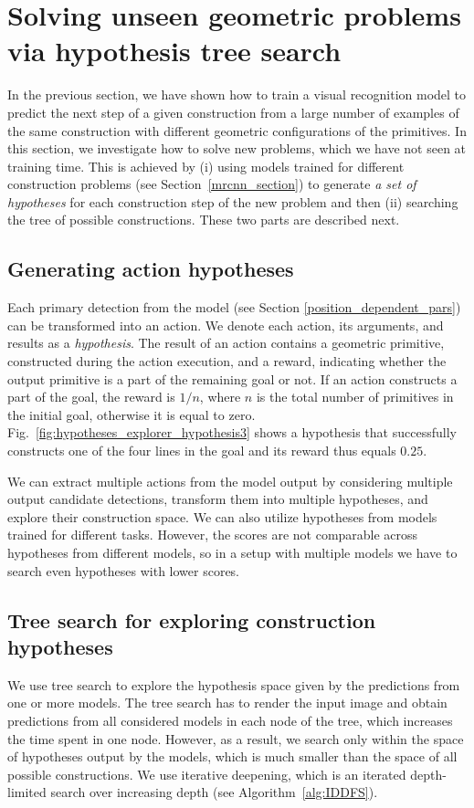 \section{Solving unseen geometric problems via hypothesis tree search}
\label{sec:unseen_levels}
In the previous section, we have shown how to train a visual recognition model to predict the next step of a given construction from a large number of examples of the same construction with different geometric configurations of the primitives. In this section, we investigate how to solve new problems, which we have not seen at training time.
This is achieved by (i) using models trained for different construction problems (see Section~\ref{mrcnn_section}) to generate {\em a set of hypotheses} for each construction step of the new problem and then (ii) searching the tree of possible constructions. These two parts are described next. 

\subsection{Generating action hypotheses}
Each primary detection from the \maskrcnn model (see Section \ref{position_dependent_pars}) can be transformed into an action.
We denote each action, its arguments, and results as a \emph{hypothesis}.
The result of an action contains a geometric primitive, constructed during the action execution, and a reward, indicating whether the output primitive is a part of the remaining goal or not.
If an action constructs a part of the goal, the reward is $1/n$, where $n$ is the total number of primitives in the initial goal, otherwise it is equal to zero.
Fig.~\ref{fig:hypotheses_explorer_hypothesis3} shows a hypothesis that successfully constructs one of the four lines in the goal and its reward thus equals $0.25$.


We can extract multiple actions from the \maskrcnn model output by considering multiple output candidate detections, transform them into multiple hypotheses, and explore their construction space.
We can also utilize hypotheses from models trained for different tasks. However, the \maskrcnn scores are not comparable across hypotheses from different models, so in a setup with multiple models we have to search even hypotheses with lower scores.
\subsection{Tree search for exploring construction hypotheses}
\label{hypotheses_tree_search}
We use tree search to explore the hypothesis space given by the predictions from one or more \maskrcnn models.
The tree search has to render the input image and obtain predictions from all considered \maskrcnn models in each node of the tree, which increases the time spent in one node.
However, as a result, we search only within the space of hypotheses output by the \maskrcnn models, which is much smaller than the space of all possible constructions.
We use iterative deepening, which is an iterated depth-limited search over increasing depth (see Algorithm~\ref{alg:IDDFS}).

